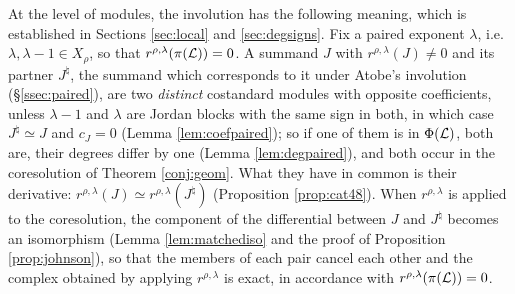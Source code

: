 \documentclass[a4paper,12pt,leqno]{amsart}
\theoremstyle{plain}
\theoremstyle{definition}
\begin{document}
\noindent At the level of modules, the involution has the following meaning, which is established in
Sections \ref{sec:local} and \ref{sec:degsigns}. Fix a paired exponent $\lambda$, i.e.\ $\lambda,\lambda-1\in
X_\rho$, so that $r^{\rho,\lambda}(\pi(\mathcal{L}))=0$. A summand $J$ with $r^{\rho,\lambda}(J)\neq0$ and its
partner $J^\natural$, the summand which corresponds to it under Atobe's involution (\S\ref{ssec:paired}), are two
\emph{distinct} costandard modules with opposite coefficients, unless $\lambda-1$ and $\lambda$ are Jordan
blocks with the same sign in both, in which case $J^\natural\simeq J$ and $c_J=0$ (Lemma
\ref{lem:coefpaired}); so if one of them is in $\Phi(\mathcal{L})$, both are, their degrees differ by one (Lemma
\ref{lem:degpaired}), and both occur in the coresolution of Theorem \ref{conj:geom}. What they have
in common is their derivative: $r^{\rho,\lambda}(J)\simeq r^{\rho,\lambda}(J^\natural)$ (Proposition \ref{prop:cat48}). When $r^{\rho,\lambda}$ is applied to the coresolution, the
component of the differential between $J$ and $J^\natural$ becomes an isomorphism (Lemma
\ref{lem:matchediso} and the proof of Proposition \ref{prop:johnson}), so that the members of each pair
cancel each other and the complex obtained by applying $r^{\rho,\lambda}$ is exact, in accordance with $r^{\rho,\lambda}(\pi(\mathcal{L}))=0$.
\end{document}
